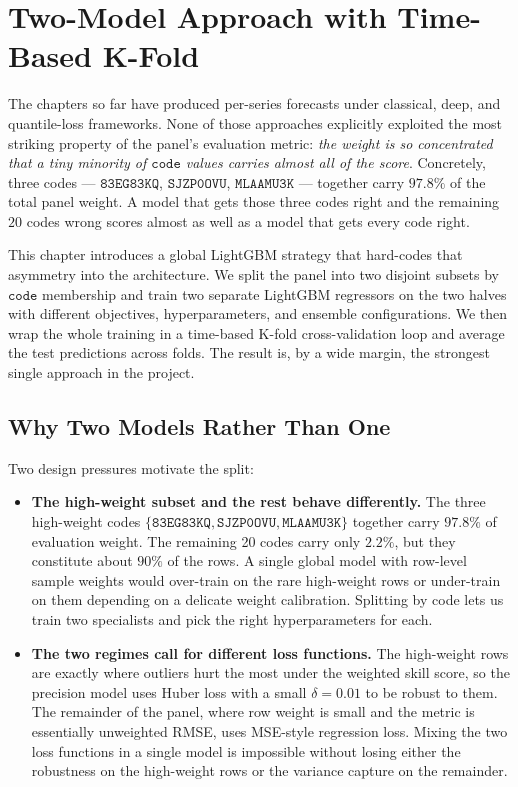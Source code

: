 \section{Two-Model Approach with Time-Based K-Fold}
\label{sec:two_model}

The chapters so far have produced per-series forecasts under classical, deep, and quantile-loss frameworks. None of those approaches explicitly exploited the most striking property of the panel's evaluation metric: \emph{the weight is so concentrated that a tiny minority of $\mathtt{code}$ values carries almost all of the score}. Concretely, three codes --- $\mathtt{83EG83KQ}$, $\mathtt{SJZP0OVU}$, $\mathtt{MLAAMU3K}$ --- together carry $97.8\%$ of the total panel weight. A model that gets those three codes right and the remaining $20$ codes wrong scores almost as well as a model that gets every code right.

This chapter introduces a global LightGBM strategy that hard-codes that asymmetry into the architecture. We split the panel into two disjoint subsets by $\mathtt{code}$ membership and train two separate LightGBM regressors on the two halves with different objectives, hyperparameters, and ensemble configurations. We then wrap the whole training in a time-based K-fold cross-validation loop and average the test predictions across folds. The result is, by a wide margin, the strongest single approach in the project.

\subsection{Why Two Models Rather Than One}
\label{sec:two_model:why}

Two design pressures motivate the split:

\begin{itemize}
  \item \textbf{The high-weight subset and the rest behave differently.} The three high-weight codes $\{\mathtt{83EG83KQ}, \mathtt{SJZP0OVU}, \mathtt{MLAAMU3K}\}$ together carry $97.8\%$ of evaluation weight. The remaining 20 codes carry only $2.2\%$, but they constitute about $90\%$ of the rows. A single global model with row-level sample weights would over-train on the rare high-weight rows or under-train on them depending on a delicate weight calibration. Splitting by code lets us train two specialists and pick the right hyperparameters for each.
  \item \textbf{The two regimes call for different loss functions.} The high-weight rows are exactly where outliers hurt the most under the weighted skill score, so the precision model uses Huber loss with a small $\delta = 0.01$ to be robust to them. The remainder of the panel, where row weight is small and the metric is essentially unweighted RMSE, uses MSE-style regression loss. Mixing the two loss functions in a single model is impossible without losing either the robustness on the high-weight rows or the variance capture on the remainder.
\end{itemize}

